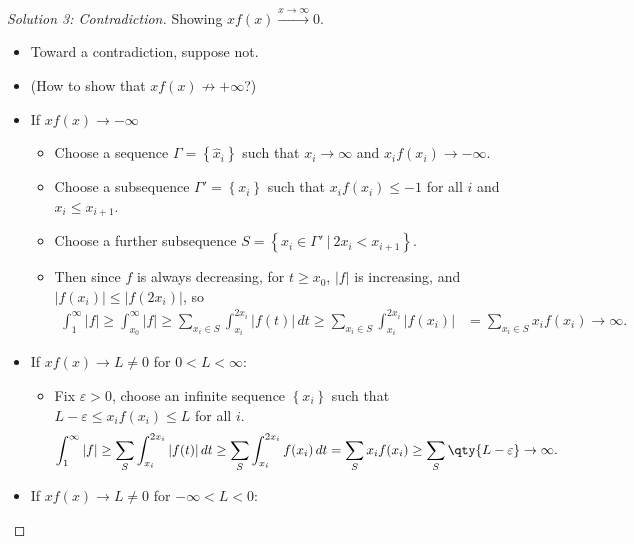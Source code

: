 \begin{solution}[of b]
\begin{proof}[Solution 3: Contradiction]
Showing \(xf(x) \overset{x\to \infty}\longrightarrow 0\).

\begin{itemize}
\tightlist
\item
  Toward a contradiction, suppose not.
\item
  (How to show that \(xf(x) \not\to + \infty\)?)
\item
  If \(xf(x)\to -\infty\)

  \begin{itemize}
  \tightlist
  \item
    Choose a sequence \(\Gamma = \left\{{\widehat{x}_i}\right\}\) such
    that \(x_i \to \infty\) and \(x_i f(x_i) \to -\infty\).
  \item
    Choose a subsequence \(\Gamma' = \left\{{x_i}\right\}\) such that
    \(x_if(x_i) \leq -1\) for all \(i\) and \(x_i \leq x_{i+1}\).
  \item
    Choose a further subsequence
    \(S = \left\{{x_i \in \Gamma' {~\mathrel{\Big|}~}2x_i < x_{i+1}}\right\}\).
  \item
    Then since \(f\) is always decreasing, for \(t\geq x_0\),
    \({\left\lvert {f} \right\rvert}\) is increasing, and
    \({\left\lvert {f(x_i)} \right\rvert} \leq {\left\lvert {f(2x_i)} \right\rvert}\),
    so
    \begin{align*}
    \int_1^{\infty} {\left\lvert {f} \right\rvert} \geq \int_{x_0}^\infty {\left\lvert {f} \right\rvert} \geq \sum_{x_i \in S} \int_{x_i}^{2x_i} {\left\lvert {f(t)} \right\rvert} \, dt \geq 
    \sum_{x_i \in S} \int_{x_i}^{2x_i} {\left\lvert {f(x_i)} \right\rvert} &= \sum_{x_i \in S} x_i f(x_i) \to \infty
    .\end{align*}
  \end{itemize}
\item
  If \(xf(x) \to L \neq 0\) for \(0 < L< \infty\):

  \begin{itemize}
  \tightlist
  \item
    Fix \({\varepsilon}> 0\), choose an infinite sequence
    \(\left\{{x_i}\right\}\) such that
    \(L-{\varepsilon}\leq x_i f(x_i) \leq L\) for all \(i\).
    \begin{align*}
    \int_1^\infty {\left\lvert {f} \right\rvert} \geq \sum_S \int_{x_i}^{2x_i} {\left\lvert {f(t)} \right\rvert}\,dt \geq \sum_S \int_{x_i}^{2x_i} f(x_i) \,dt = \sum_S x_i f(x_i) \geq \sum_S \qty{L-{\varepsilon}} \to \infty
    .\end{align*}
  \end{itemize}
\item
  If \(xf(x) \to L \neq 0\) for \(-\infty < L < 0\):


\end{itemize}
\end{proof}
\end{solution}

